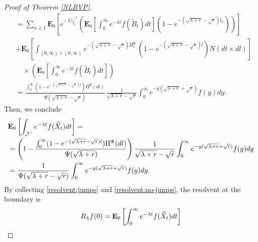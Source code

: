 \documentclass[11pt,a4paper]{article}
\theoremstyle{definition}
\theoremstyle{remark}
\begin{document}
\begin{proof}[Proof of Theorem \ref{NLBVP}]
\begin{align*}
		&= \sum_{n \geq 1} \mathbf{E}_{0}\left[e^{-\lambda \widetilde{\gamma}^{-1}_{l_n^-}} \left(\mathbf{E}_{0}  \left[\int_0^\infty e^{-\lambda t} f(\widetilde{B}_t) dt\right] (1-e^{-(\sqrt{\lambda + r} - \sqrt{r}) l_n}) \right) \right]\\
		&+ \mathbf{E}_{0} \left[\int_{(0,\infty) \times (0,\infty)} e^{-(\sqrt{\lambda+r}-\sqrt{r}) H^\Psi_{t^-}} (1-e^{-(\sqrt{\lambda + r} - \sqrt{r}) l})  N(dt \times dl)\right] \\
		&\quad \times \left(\mathbf{E}_{0}  \left[\int_0^\infty e^{-\lambda t} f(\widetilde{B}_t) dt\right] \right)\\
		&=\frac{\int_0^\infty(1-e^{-(\sqrt{\lambda + r} - \sqrt{r}) l}) \Pi^\Psi(dl)}{\Psi(\sqrt{\lambda + r} - \sqrt{r})} \, \frac{1 }{\sqrt{\lambda + r} - \sqrt{r}} \int_0^\infty e^{-y(\sqrt{\lambda + r} + \sqrt{r})}f(y) dy.
	\end{align*}
	Then, we conclude
	\begin{align}
		\label{resolvent:no-jumps}
		&\mathbf{E}_{0}  \left[\int_{\mathcal{J}^c} e^{-\lambda t} f(\widetilde{X}_t) dt\right]=\\
		&=\left(1- \frac{\int_0^\infty(1-e^{-(\sqrt{\lambda + r} - \sqrt{r}) l}) \Pi^\Psi(dl)}{\Psi(\sqrt{\lambda + r})} \right)  \frac{1 }{\sqrt{\lambda + r} - \sqrt{r}}  \int_0^\infty e^{-y(\sqrt{\lambda + r} + \sqrt{r})} f(y) dy \notag\\
		&=\frac{1}{\Psi(\sqrt{\lambda + r} - \sqrt{r})} \int_0^\infty e^{-y(\sqrt{\lambda + r} + \sqrt{r})} f(y) dy.
	\end{align}
	By collecting \eqref{resolvent:jumps} and \eqref{resolvent:no-jumps}, the resolvent at the boundary is
	\begin{align}
		\label{resolvent:Xtilde0}
		R_\lambda f(0)&= \mathbf{E}_{0}  \left[\int_0^\infty e^{-\lambda t} f (\widetilde{X}_t) dt\right] \notag \\

\end{align}
\end{proof}
\end{document}
